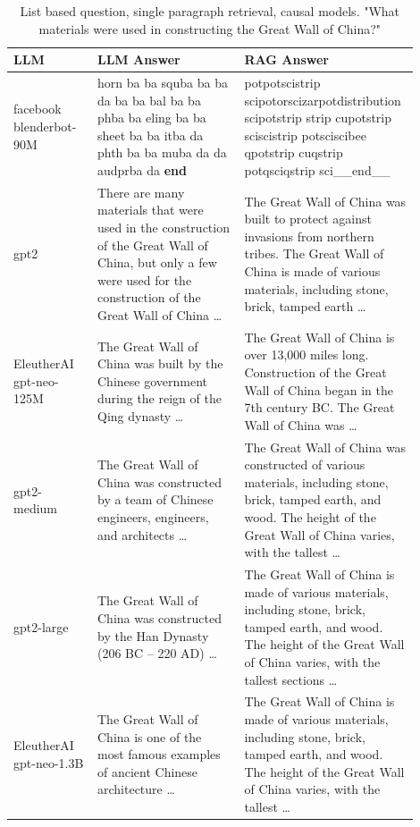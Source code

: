 \documentclass{wseas}
\begin{document}
\begin{table}[htbp]
  \centering
  \caption{List based question, single paragraph retrieval, causal models. "What materials were used in constructing the Great Wall of China?"}
  \label{tab:experiment_R_1_paragraph_Q_listBased_M_causal_table}
  \begin{tabular}{|p{0.20\linewidth}|p{0.35\linewidth}|p{0.35\linewidth}|}
    \hline
    \textbf{LLM} & \textbf{LLM Answer} & \textbf{RAG Answer} \\
    \hline
    facebook blenderbot-90M & horn ba ba squba ba ba da ba ba bal ba ba phba ba eling ba ba sheet ba ba itba da phth ba ba muba da da audprba da \textbf{end} & potpotscistrip scipotorscizarpotdistribution scipotstrip strip cupotstrip sciscistrip potsciscibee qpotstrip cuqstrip potqsciqstrip sci\_\_end\_\_ \\
    \hline
    gpt2 & There are many materials that were used in the construction of the Great Wall of China, but only a few were used for the construction of the Great Wall of China \ldots{} & The Great Wall of China was built to protect against invasions from northern tribes. The Great Wall of China is made of various materials, including stone, brick, tamped earth \ldots{} \\
    \hline
    EleutherAI gpt-neo-125M & The Great Wall of China was built by the Chinese government during the reign of the Qing dynasty \ldots{} & The Great Wall of China is over 13,000 miles long. Construction of the Great Wall of China began in the 7th century BC. The Great Wall of China was \ldots{} \\
    \hline
    gpt2-medium & The Great Wall of China was constructed by a team of Chinese engineers, engineers, and architects \ldots{} & The Great Wall of China was constructed of various materials, including stone, brick, tamped earth, and wood. The height of the Great Wall of China varies, with the tallest \ldots{} \\
    \hline
    gpt2-large & The Great Wall of China was constructed by the Han Dynasty (206 BC -- 220 AD) \ldots{} & The Great Wall of China is made of various materials, including stone, brick, tamped earth, and wood. The height of the Great Wall of China varies, with the tallest sections \ldots{} \\
    \hline
    EleutherAI gpt-neo-1.3B & The Great Wall of China is one of the most famous examples of ancient Chinese architecture \ldots{} & The Great Wall of China is made of various materials, including stone, brick, tamped earth, and wood. The height of the Great Wall of China varies, with the tallest \ldots{} \\
    \hline
  \end{tabular}
\end{table}
\end{document}
